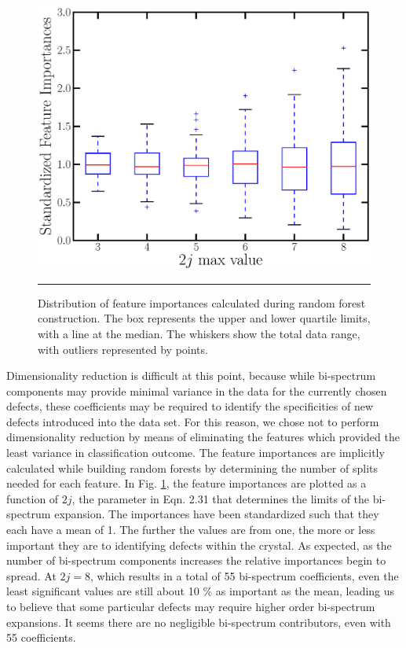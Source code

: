 \documentclass[12pt]{iopart}
\begin{document}
\begin{figure}[htbp]
  \centering
    \includegraphics[scale=0.50]{Figures/featureimportance.eps}
    \rule{35em}{0.5pt}
  \caption[]{Distribution of feature importances calculated during random forest construction. The box represents the upper and lower quartile limits, with a line at the median. The whiskers show the total data range, with outliers represented by points.}
  \label{fig:featimport}
\end{figure}

Dimensionality reduction is difficult at this point, because while bi-spectrum components may provide minimal variance in the data for the currently chosen defects, these coefficients may be required to identify the specificities of new defects introduced into the data set. For this reason, we chose not to perform dimensionality reduction by means of eliminating the features which provided the least variance in classification outcome. The feature importances are implicitly calculated while building random forests by determining the number of splits needed for each feature. In Fig. \ref{fig:featimport}, the feature importances are plotted as a function of $2j$, the parameter in Eqn. 2.31 that determines the limits of the bi-spectrum expansion. The importances have been standardized such that they each have a mean of 1. The further the values are from one, the more or less important they are to identifying defects within the crystal. As expected, as the number of bi-spectrum components increases the relative importances begin to spread. At $2j=8$, which results in a total of 55 bi-spectrum coefficients, even the least significant values are still about 10 \% as important as the mean, leading us to believe that some particular defects may require higher order bi-spectrum expansions. It seems there are no negligible bi-spectrum contributors, even with 55 coefficients.
\end{document}
